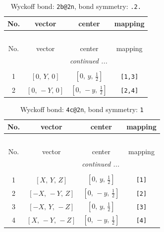 \documentclass[fleqn,8pt]{jsarticle}
\begin{document}
\renewcommand{\arraystretch}{1.2}
\begin{longtable}{cccc}
\caption{Wyckoff bond: {\tt 2b@2n}, bond symmetry: {\tt .2.}}
 \\
 \hline \hline
No. & vector & center & mapping \\ \hline \endfirsthead

\multicolumn{3}{l}{\tablename\ \thetable{}} \\
 \hline \hline
No. & vector & center & mapping \\ \hline \endhead

 \hline \hline
\multicolumn{3}{r}{\footnotesize\it continued ...} \\ \endfoot

 \hline \hline
\multicolumn{3}{r}{} \\ \endlastfoot

1 & $\left[ 0,\, Y,\, 0 \right]$ & $\left[ 0,\, y,\, \frac{1}{2} \right]$ & {\tt [1,3]} \\ \hline
2 & $\left[ 0,\, - Y,\, 0 \right]$ & $\left[ 0,\, - y,\, \frac{1}{2} \right]$ & {\tt [2,4]} \\
\end{longtable}
\renewcommand{\arraystretch}{1.2}
\begin{longtable}{cccc}
\caption{Wyckoff bond: {\tt 4c@2n}, bond symmetry: {\tt 1}}
 \\
 \hline \hline
No. & vector & center & mapping \\ \hline \endfirsthead

\multicolumn{3}{l}{\tablename\ \thetable{}} \\
 \hline \hline
No. & vector & center & mapping \\ \hline \endhead

 \hline \hline
\multicolumn{3}{r}{\footnotesize\it continued ...} \\ \endfoot

 \hline \hline
\multicolumn{3}{r}{} \\ \endlastfoot

1 & $\left[ X,\, Y,\, Z \right]$ & $\left[ 0,\, y,\, \frac{1}{2} \right]$ & {\tt [1]} \\ \hline
2 & $\left[ - X,\, - Y,\, Z \right]$ & $\left[ 0,\, - y,\, \frac{1}{2} \right]$ & {\tt [2]} \\ \hline
3 & $\left[ - X,\, Y,\, - Z \right]$ & $\left[ 0,\, y,\, \frac{1}{2} \right]$ & {\tt [3]} \\ \hline
4 & $\left[ X,\, - Y,\, - Z \right]$ & $\left[ 0,\, - y,\, \frac{1}{2} \right]$ & {\tt [4]} \\
\end{longtable}
\end{document}
